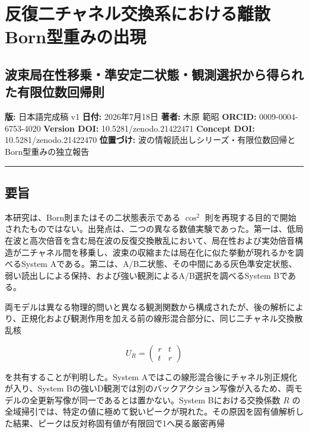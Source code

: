 \documentclass[
  a4paper,
  10pt]{article}
\author{}
\date{}
\begin{document}
\section{反復二チャネル交換系における離散Born型重みの出現}\label{ux53cdux5fa9ux4e8cux30c1ux30e3ux30cdux30ebux4ea4ux63dbux7cfbux306bux304aux3051ux308bux96e2ux6563bornux578bux91cdux307fux306eux51faux73fe}

\subsection{波束局在性移乗・準安定二状態・観測選択から得られた有限位数回帰則}\label{ux6ce2ux675fux5c40ux5728ux6027ux79fbux4e57ux6e96ux5b89ux5b9aux4e8cux72b6ux614bux89b3ux6e2cux9078ux629eux304bux3089ux5f97ux3089ux308cux305fux6709ux9650ux4f4dux6570ux56deux5e30ux5247}

\textbf{版:} 日本語完成稿 v1 \textbf{日付:} 2026年7月18日 \textbf{著者:}
木原 範昭 \textbf{ORCID:} 0009-0004-6753-4020 \textbf{Version DOI:}
10.5281/zenodo.21422471 \textbf{Concept DOI:} 10.5281/zenodo.21422470
\textbf{位置づけ:}
波の情報読出しシリーズ・有限位数回帰とBorn型重みの独立報告

\begin{center}\rule{0.5\linewidth}{0.5pt}\end{center}

\subsection{要旨}\label{ux8981ux65e8}

本研究は、Born則またはその二状態表示である \(\cos^2\)
則を再現する目的で開始されたものではない。出発点は、二つの異なる数値実験であった。第一は、低局在波と高次倍音を含む局在波の反復交換散乱において、局在性および実効倍音構造が二チャネル間を移乗し、波束の収縮または局在化に似た挙動が現れるかを調べるSystem
Aである。第二は、A/B二状態、その中間にある灰色準安定状態、弱い読出しによる保持、および強い観測によるA/B選択を調べるSystem
Bである。

両モデルは異なる物理的問いと異なる観測関数から構成されたが、後の解析により、正規化および観測作用を加える前の線形混合部分に、同じ二チャネル交換散乱核

\[
U_R=
\begin{pmatrix}
r&t\\
t&r
\end{pmatrix}
\]

を共有することが判明した。System
Aではこの線形混合後にチャネル別正規化が入り、System
Bの強いD観測では別のバックアクション写像が入るため、両モデルの全更新写像が同一であるとは置かない。System
Bにおける交換係数 \(R\)
の全域掃引では、特定の値に極めて鋭いピークが現れた。その原因を固有値解析した結果、ピークは反対称固有値が有限回で1へ戻る厳密再帰
\end{document}
